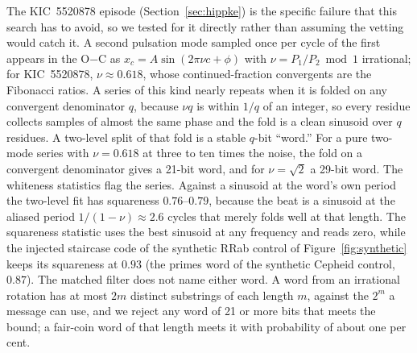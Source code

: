 \documentclass[final,5p]{elsarticle}
\newcommand{\oc}{O$-$C}
\begin{document}
The KIC~5520878 episode (Section~\ref{sec:hippke}) is the specific failure that this search has to avoid, so we tested for it directly rather than assuming the vetting would catch it. A second pulsation mode sampled once per cycle of the first appears in the \oc{} as $x_c = A\sin(2\pi\nu c + \phi)$ with $\nu = P_1/P_2 \bmod 1$ irrational; for KIC~5520878, $\nu\approx0.618$, whose continued-fraction convergents are the Fibonacci ratios. A series of this kind nearly repeats when it is folded on any convergent denominator $q$, because $\nu q$ is within $1/q$ of an integer, so every residue collects samples of almost the same phase and the fold is a clean sinusoid over $q$ residues. A two-level split of that fold is a stable $q$-bit ``word.'' For a pure two-mode series with $\nu=0.618$ at three to ten times the noise, the fold on a convergent denominator gives a 21-bit word, and for $\nu=\sqrt2$ a 29-bit word. The whiteness statistics flag the series. Against a sinusoid at the word's own period the two-level fit has squareness $0.76$--$0.79$, because the beat is a sinusoid at the aliased period $1/(1-\nu)\approx2.6$ cycles that merely folds well at that length. The squareness statistic uses the best sinusoid at any frequency and reads zero, while the injected staircase code of the synthetic RRab control of Figure~\ref{fig:synthetic} keeps its squareness at $0.93$ (the primes word of the synthetic Cepheid control, $0.87$). The matched filter does not name either word. A word from an irrational rotation has at most $2m$ distinct substrings of each length $m$, against the $2^m$ a message can use, and we reject any word of 21 or more bits that meets the bound; a fair-coin word of that length meets it with probability of about one per cent.
\end{document}
